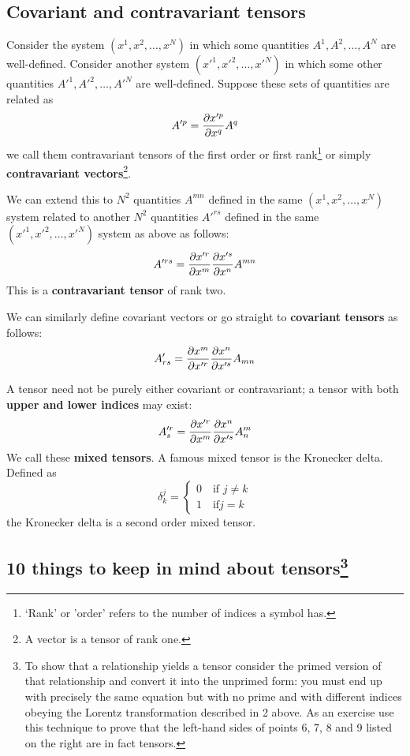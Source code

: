 \documentclass{tufte-handout}
\begin{document}
\subsection{Covariant and contravariant tensors}

Consider the system $(x^1,x^2,\ldots,x^N)$ in which some quantities $A^1,A^2,\ldots,A^N$ are well-defined. Consider another system $(x'^1,x'^2,\ldots,x'^N)$ in which some other quantities $A'^1,A'^2,\ldots,A'^N$ are well-defined. Suppose these sets of quantities are related as
\[
	A'^p = {\partial x'^p \over \partial x^q} A^q
\]
we call them contravariant tensors of the first order or first rank\footnote{`Rank' or 'order' refers to the number of indices a symbol has.} or simply \textbf{contravariant vectors}\footnote{A vector is a tensor of rank one.}.

We can extend this to $N^2$ quantities $A^{mn}$ defined in the same $(x^1,x^2,\ldots,x^N)$ system related to another $N^2$ quantities $A'^{rs}$ defined in the same $(x'^1,x'^2,\ldots,x'^N)$ system as above as follows:
\begin{equation}
	A'^{rs} = {\partial x'^r \over \partial x^m} {\partial x'^s \over \partial x^n} A^{mn} \label{eq:contravariant-tensor}
\end{equation}
This is a \textbf{contravariant tensor} of rank two.

We can similarly define covariant vectors or go straight to \textbf{covariant tensors} as follows:
\begin{equation}
	A'_{rs} = {\partial x^m \over \partial x'^r} {\partial x^n \over \partial x'^s} A_{mn} \label{eq:covariant-tensor}
\end{equation}

A tensor need not be purely either covariant or contravariant; a tensor with both \textbf{upper and lower indices} may exist:
\begin{equation}
	A'^r_s = {\partial x'^r \over \partial x^m} {\partial x^n \over \partial x'^s} A^m_n \label{eq:mixed-tensor}
\end{equation}
We call these \textbf{mixed tensors}. A famous mixed tensor is the Kronecker delta. Defined as
\[
\delta^j_k = 
\left\lbrace
\begin{array}{ll}
	0 \quad \textrm{if } j \neq k \\
	1 \quad \textrm{if} j = k
\end{array}
\right.
\]
the Kronecker delta is a second order mixed tensor.

\subsection{10 things to keep in mind about tensors\protect\footnote{To show that a relationship yields a tensor consider the primed version of that relationship and convert it into the unprimed form: you must end up with precisely the same equation but with no prime and with different indices obeying the Lorentz transformation described in 2 above. As an exercise use this technique to prove that the left-hand sides of points 6, 7, 8 and 9 listed on the right are in fact tensors.}}
\end{document}
